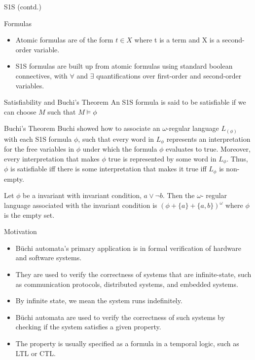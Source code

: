 \documentclass[14pts]{beamer}
\begin{document}
    \begin{frame}{S1S (contd.)}
      \begin{block}{Formulas}
        \begin{itemize}
          \item Atomic formulas are of the form $t \in X$ where t is a term and X is a second-order variable.
          \item S1S formulas are built up from atomic formulas using standard boolean connectives, with $\forall$ and $\exists$ quantifications over first-order and second-order variables.
        \end{itemize}
      \end{block}
    \end{frame}
    \begin{frame}{Satisfiability and Buchi's Theorem}
      An S1S formula is said to be satisfiable if we can choose $M$ such that $M \vDash \phi$
      \begin{block}{Buchi's Theorem}
        Buchi showed how to associate an $\omega$-regular language $L_{(\phi)}$ with each S1S formula
$\phi$, such that every word in $L_{\phi}$ represents an interpretation for the free variables in
$\phi$ under which the formula $\phi$ evaluates to true. Moreover, every interpretation that
makes $\phi$ true is represented by some word in $L_{\phi}$. Thus, $\phi$ is satisfiable iff there
is some interpretation that makes it true iff $L_{\phi}$ is non-empty. 
      \end{block}
      \begin{example}
        Let $\phi$ be a invariant with invariant condition, $a \vee \neg b$. Then the $\omega$- regular language 
        associated with the invariant condition is $(\phi + \{a\} + \{a, b\})^{\omega}$ where $\phi $ is the empty set.
      \end{example}
    \end{frame}
    \begin{frame}{Motivation}
      \begin{itemize}
        \item<1-> Büchi automata's primary application is in formal verification of hardware and software systems.
        \item <2-> They are used to verify the correctness of systems that are infinite-state, such as communication protocols, distributed systems, and embedded systems.
        \item <3-> By infinite state, we mean the system runs indefinitely.
        \item <4-> Büchi automata are used to verify the correctness of such systems by checking if the system satisfies a given property.
        \item <5-> The property is usually specified as a formula in a temporal logic, such as LTL or CTL.
      \end{itemize}
    \end{frame}
\end{document}
